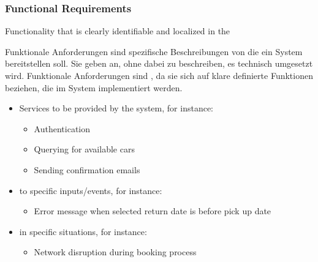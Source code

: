 \subsubsection{Functional Requirements}
\begin{defBox}[title=Functional requirement ($\neq$ functional specification)]
    Functionality that is clearly identifiable and localized in the 
\end{defBox}
\begin{infoBox}
    Funktionale Anforderungen sind spezifische Beschreibungen von  die ein System bereitstellen soll. Sie geben an,  ohne dabei zu beschreiben,  es technisch umgesetzt wird. Funktionale Anforderungen sind , da sie sich auf klare definierte Funktionen beziehen, die im System implementiert werden.
\end{infoBox}
\begin{defBox}[title=Functional Requirements Specify ...]
    \begin{itemize}
        \item Services to be provided by the system, for instance:
        \begin{itemize}
            \item Authentication
            \item Querying for available cars
            \item Sending confirmation emails
        \end{itemize}
        \item {} to specific inputs/events, for instance:
        \begin{itemize}
            \item Error message when selected return date is before pick up date
        \end{itemize}
        \item {} in specific situations, for instance:
        \begin{itemize}
            \item Network disruption during booking process
        \end{itemize}
    \end{itemize}
\end{defBox}
